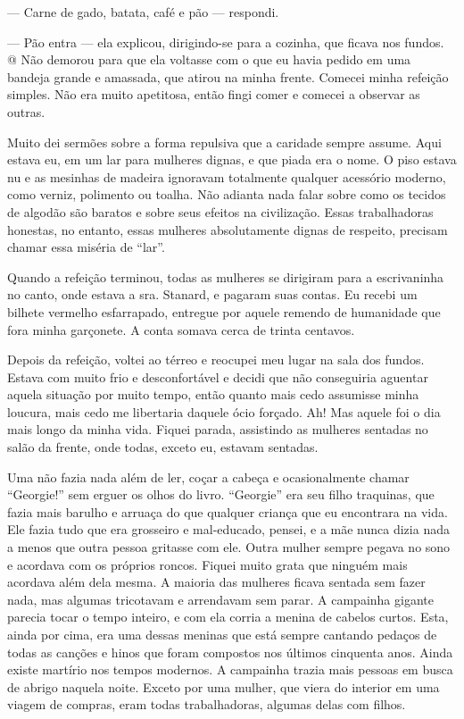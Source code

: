 --- Carne de gado, batata, café e pão --- respondi.

--- Pão entra --- ela explicou, dirigindo-se para a cozinha, que ficava
nos fundos. @ Não demorou para que ela voltasse com o que eu havia
pedido em uma bandeja grande e amassada, que atirou na minha frente.
Comecei minha refeição simples. Não era muito apetitosa, então fingi
comer e comecei a observar as outras.

Muito dei sermões sobre a forma repulsiva que a caridade sempre assume.
Aqui estava eu, em um lar para mulheres dignas, e que piada era o nome.
O piso estava nu e as mesinhas de madeira ignoravam totalmente qualquer
acessório moderno, como verniz, polimento ou toalha. Não adianta nada
falar sobre como os tecidos de algodão são baratos e sobre seus efeitos
na civilização. Essas trabalhadoras honestas, no entanto, essas mulheres
absolutamente dignas de respeito, precisam chamar essa miséria de
``lar''.

Quando a refeição terminou, todas as mulheres se dirigiram para a
escrivaninha no canto, onde estava a sra. Stanard, e pagaram suas
contas. Eu recebi um bilhete vermelho esfarrapado, entregue por aquele
remendo de humanidade que fora minha garçonete. A conta somava cerca de
trinta centavos.

Depois da refeição, voltei ao térreo e reocupei meu lugar na sala dos
fundos. Estava com muito frio e desconfortável e decidi que não
conseguiria aguentar aquela situação por muito tempo, então quanto mais
cedo assumisse minha loucura, mais cedo me libertaria daquele ócio
forçado. Ah! Mas aquele foi o dia mais longo da minha vida. Fiquei
parada, assistindo as mulheres sentadas no salão da frente, onde todas,
exceto eu, estavam sentadas.

Uma não fazia nada além de ler, coçar a cabeça e ocasionalmente chamar
``Georgie!'' sem erguer os olhos do livro. ``Georgie'' era seu filho
traquinas, que fazia mais barulho e arruaça do que qualquer criança que
eu encontrara na vida. Ele fazia tudo que era grosseiro e mal-educado,
pensei, e a mãe nunca dizia nada a menos que outra pessoa gritasse com
ele. Outra mulher sempre pegava no sono e acordava com os próprios
roncos. Fiquei muito grata que ninguém mais acordava além dela mesma. A
maioria das mulheres ficava sentada sem fazer nada, mas algumas
tricotavam e arrendavam sem parar. A campainha gigante parecia tocar o
tempo inteiro, e com ela corria a menina de cabelos curtos. Esta, ainda
por cima, era uma dessas meninas que está sempre cantando pedaços de
todas as canções e hinos que foram compostos nos últimos cinquenta anos.
Ainda existe martírio nos tempos modernos. A campainha trazia mais
pessoas em busca de abrigo naquela noite. Exceto por uma mulher, que
viera do interior em uma viagem de compras, eram todas trabalhadoras,
algumas delas com filhos.

